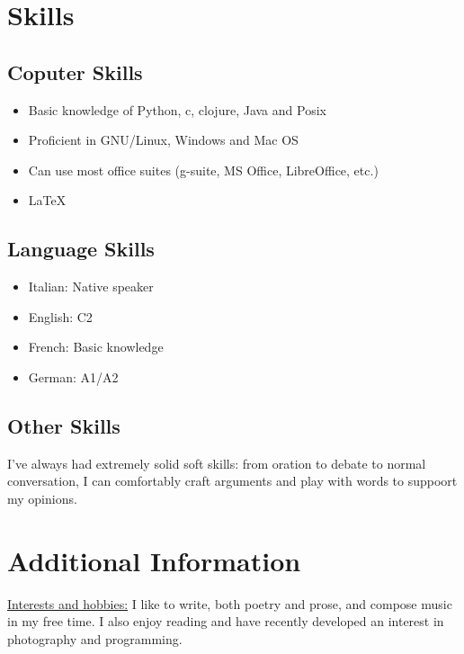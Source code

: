 \documentclass[12pt]{article}
\begin{document}
\section{Skills}
	\subsection{Coputer Skills}
		\begin{itemize}
			\item{Basic knowledge of Python, c, clojure, Java and Posix}
			\item{Proficient in GNU/Linux, Windows and Mac OS}
			\item{Can use most office suites (g-suite, MS Office, LibreOffice, etc.)}
			\item{\LaTeX}
		\end{itemize}
	\subsection{Language Skills}
		\begin{itemize}
			\item{Italian: Native speaker}
			\item{English: C2}
			\item{French: Basic knowledge}
			\item{German: A1/A2}
		\end{itemize}
	\subsection{Other Skills}
	I've always had extremely solid soft skills: from oration to debate to normal conversation, I can comfortably craft arguments and play with words to suppoort my opinions.

\section{Additional Information}
\underline{Interests and hobbies:}
I like to write, both poetry and prose, and compose music in my free
time. I also enjoy reading and have recently developed an interest in photography and programming.
\end{document}
